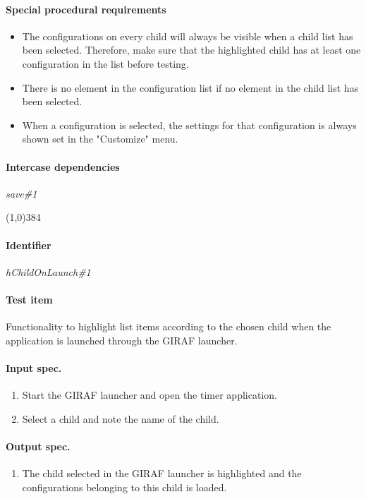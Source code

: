 \paragraph{Special procedural requirements}
	\begin{itemize}
		\item The configurations on every child will always be visible when a child list has been selected. Therefore, make sure that the highlighted child has at least one configuration in the list before testing.
		\item There is no element in the configuration list if no element in the child list has been selected.
		\item When a configuration is selected, the settings for that configuration is always shown set in the "Customize" menu.
	\end{itemize}
\paragraph{Intercase dependencies}
	\textit{save\#1}
\begin{center}
	\line(1,0){384}
\end{center}

\pagebreak
\paragraph{Identifier}
	\textit{hChildOnLaunch\#1}
\paragraph{Test item}
	Functionality to highlight list items according to the chosen child when the application is launched through the GIRAF launcher.
\paragraph{Input spec.}
	\begin{enumerate}
		\item Start the GIRAF launcher and open the timer application.
		\item Select a child and note the name of the child.
	\end{enumerate}
\paragraph{Output spec.}
	\begin{enumerate}
		\item The child selected in the GIRAF launcher is highlighted and the configurations belonging to this child is loaded.
	\end{enumerate}
